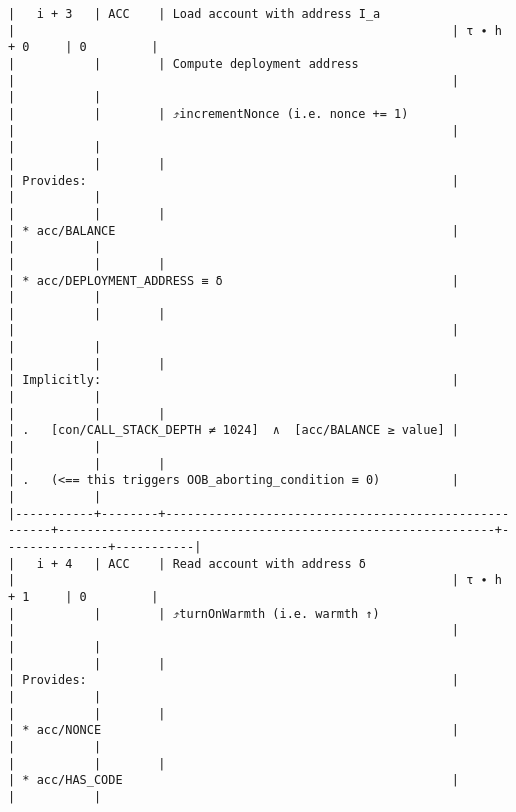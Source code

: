 \documentclass[varwidth=\maxdimen,margin=0.5cm,multi={verbatim}]{standalone}
\begin{document}
\begin{verbatim}
|   i + 3   | ACC    | Load account with address I_a                        |                                                             | τ ∙ h + 0     | 0         |
|           |        | Compute deployment address                           |                                                             |               |           |
|           |        | ⤴️incrementNonce (i.e. nonce += 1)                   |                                                             |               |           |
|           |        |                                                      | Provides:                                                   |               |           |
|           |        |                                                      | * acc/BALANCE                                               |               |           |
|           |        |                                                      | * acc/DEPLOYMENT_ADDRESS ≡ δ                                |               |           |
|           |        |                                                      |                                                             |               |           |
|           |        |                                                      | Implicitly:                                                 |               |           |
|           |        |                                                      | .   [con/CALL_STACK_DEPTH ≠ 1024]  ∧  [acc/BALANCE ≥ value] |               |           |
|           |        |                                                      | .   (<== this triggers OOB_aborting_condition ≡ 0)          |               |           |
|-----------+--------+------------------------------------------------------+-------------------------------------------------------------+---------------+-----------|
|   i + 4   | ACC    | Read account with address δ                          |                                                             | τ ∙ h + 1     | 0         |
|           |        | ⤴️turnOnWarmth (i.e. warmth ↑)                       |                                                             |               |           |
|           |        |                                                      | Provides:                                                   |               |           |
|           |        |                                                      | * acc/NONCE                                                 |               |           |
|           |        |                                                      | * acc/HAS_CODE                                              |               |           |

\end{verbatim}
\end{document}
